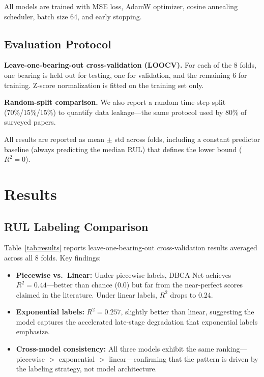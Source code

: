 \documentclass[5p,twocolumn]{elsarticle}
\begin{document}
All models are trained with MSE loss, AdamW optimizer, cosine annealing scheduler, batch size 64, and early stopping.

\subsection{Evaluation Protocol}

\textbf{Leave-one-bearing-out cross-validation (LOOCV).} For each of the 8 folds, one bearing is held out for testing, one for validation, and the remaining 6 for training. Z-score normalization is fitted on the training set only.

\textbf{Random-split comparison.} We also report a random time-step split (70\%/15\%/15\%) to quantify data leakage---the same protocol used by 80\% of surveyed papers.

All results are reported as mean $\pm$ std across folds, including a constant predictor baseline (always predicting the median RUL) that defines the lower bound ($R^2 = 0$).


\section{Results}
\label{sec:results}

\subsection{RUL Labeling Comparison}

Table~\ref{tab:results} reports leave-one-bearing-out cross-validation results averaged across all 8 folds. Key findings:

\begin{itemize}
    \item \textbf{Piecewise vs.\ Linear:} Under piecewise labels, DBCA-Net achieves $R^2 = 0.44$---better than chance (0.0) but far from the near-perfect scores claimed in the literature. Under linear labels, $R^2$ drops to 0.24.
    \item \textbf{Exponential labels:} $R^2 = 0.257$, slightly better than linear, suggesting the model captures the accelerated late-stage degradation that exponential labels emphasize.
    \item \textbf{Cross-model consistency:} All three models exhibit the same ranking---piecewise $>$ exponential $>$ linear---confirming that the pattern is driven by the labeling strategy, not model architecture.
\end{itemize}
\end{document}
